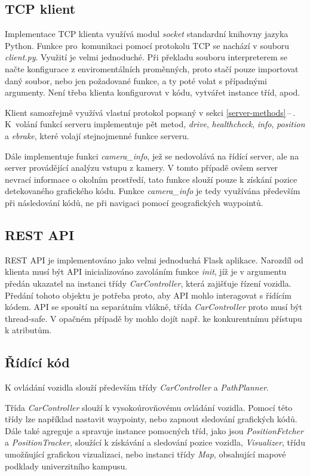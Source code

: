 \documentclass[czech, bachelor]{diploma}
\newcommand{\filipref}[1]{\ref{#1}\,--\,\nameref{#1}}
\begin{document}
\subsection{TCP klient}

Implementace TCP klienta využívá modul \emph{socket} standardní knihovny jazyka Python. Funkce pro~komunikaci pomocí protokolu TCP
se nachází v souboru \emph{client.py}. Využití je velmi jednoduché. Při překladu souboru interpreterem se načte konfigurace
z enviromentálních proměnných, proto stačí pouze importovat daný soubor, nebo jen požadované funkce, a ty poté volat s případnými
argumenty. Není třeba klienta konfigurovat v kódu, vytvářet instance tříd, apod.

Klient samozřejmě využívá vlastní protokol popsaný v sekci \filipref{server-methods}. K~volání funkcí serveru implementuje pět
metod, \emph{drive}, \emph{healthcheck}, \emph{info}, \emph{position} a \emph{ebrake}, které volají stejnojmenné funkce serveru.

Dále implementuje funkci \emph{camera\_info}, jež se nedovolává na řídící server, ale na server provádějící analýzu vstupu
z kamery. V tomto případě ovšem server nevrací informace o okolním prostředí, tato funkce slouží pouze k získání pozice
detekovaného grafického kódu. Funkce \emph{camera\_info} je tedy využívána především při následování kódů, ne při navigaci pomocí
geografických waypointů.

\subsection{REST API}

REST API je implementováno jako velmi jednoduchá Flask aplikace. Narozdíl od klienta musí být API inicializováno zavoláním funkce
\emph{init}, jíž je v argumentu předán ukazatel na instanci třídy \emph{CarController}, která zajišťuje řízení vozidla. Předání
tohoto objektu je potřeba proto, aby API mohlo interagovat s řídícím kódem. API se spouští na separátním vlákně, třída
\emph{CarController} proto musí být thread-safe. V opačném případě by mohlo dojít např. ke konkurentnímu přístupu k atributům.

\subsection{Řídící kód}

K ovládání vozidla slouží především třídy \emph{CarController} a \emph{PathPlanner}.

Třída \emph{CarController} slouží k vysokoúrovňovému ovládání vozidla. Pomocí této třídy lze například nastavit waypointy, nebo
zapnout sledování grafických kódů. Dále také agreguje a spravuje instance pomocných tříd, jako jsou \emph{PositionFetcher}
a \emph{PositionTracker}, sloužící k získávání a sledování pozice vozidla, \emph{Visualizer}, třídu umožňující grafickou
vizualizaci, nebo instanci třídy \emph{Map}, obsahující mapové podklady univerzitního kampusu.
\end{document}
